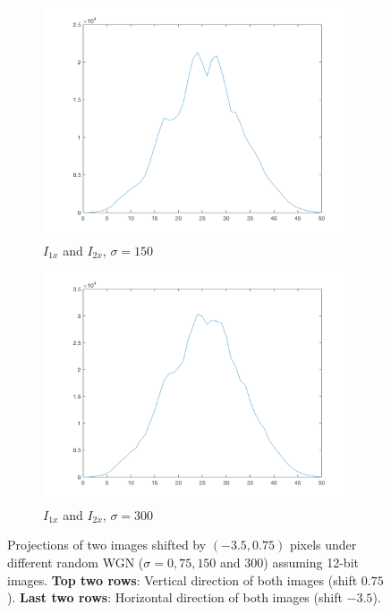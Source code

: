 \begin{figure}[htpb]
\begin{subfigure}{.25\textwidth}
\includegraphics[width=1\textwidth]{img/ProjYI2sigma150}
\caption{$I_{1x}$ and $I_{2x}$, $\sigma\!=\!150$}
\end{subfigure}%
\begin{subfigure}{.25\textwidth}
\includegraphics[width=1\textwidth]{img/ProjYI2sigma300}
\caption{$I_{1x}$ and $I_{2x}$, $\sigma\!=\!300$}
\end{subfigure}
\caption{Projections of two images shifted by $(-3.5, 0.75)$ pixels under different random WGN ($\sigma=0,75,150$ and $300$) assuming 12-bit images. \textbf{Top two rows}: Vertical direction of both images (shift $0.75$). \textbf{Last two rows}: Horizontal direction of both images (shift $-3.5$).}
\label{fig:projImages}
\end{figure}


